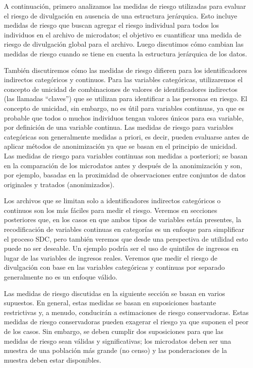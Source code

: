 \documentclass[
]{book}
\theoremstyle{definition}
\theoremstyle{definition}
\theoremstyle{definition}
\theoremstyle{definition}
\theoremstyle{remark}
\begin{document}
A continuación, primero analizamos las medidas de riesgo utilizadas para evaluar el riesgo de divulgación en ausencia de una estructura jerárquica. Esto incluye medidas de riesgo que buscan agregar el riesgo individual para todos los individuos en el archivo de microdatos; el objetivo es cuantificar una medida de riesgo de divulgación global para el archivo. Luego discutimos cómo cambian las medidas de riesgo cuando se tiene en cuenta la estructura jerárquica de los datos.

También discutiremos cómo las medidas de riesgo difieren para los identificadores indirectos categóricos y continuos. Para las variables categóricas, utilizaremos el concepto de unicidad de combinaciones de valores de identificadores indirectos (las llamadas ``claves'') que se utilizan para identificar a las personas en riesgo. El concepto de unicidad, sin embargo, no es útil para variables continuas, ya que es probable que todos o muchos individuos tengan valores únicos para esa variable, por definición de una variable continua. Las medidas de riesgo para variables categóricas son generalmente medidas a priori, es decir, pueden evaluarse antes de aplicar métodos de anonimización ya que se basan en el principio de unicidad. Las medidas de riesgo para variables continuas son medidas a posteriori; se basan en la comparación de los microdatos antes y después de la anonimización y son, por ejemplo, basadas en la proximidad de observaciones entre conjuntos de datos originales y tratados (anonimizados).

Los archivos que se limitan solo a identificadores indirectos categóricos o continuos son los más fáciles para medir el riesgo. Veremos en secciones posteriores que, en los casos en que ambos tipos de variables están presentes, la recodificación de variables continuas en categorías es un enfoque para simplificar el proceso SDC, pero también veremos que desde una perspectiva de utilidad esto puede no ser deseable. Un ejemplo podría ser el uso de quintiles de ingresos en lugar de las variables de ingresos reales. Veremos que medir el riesgo de divulgación con base en las variables categóricas y continuas por separado generalmente no es un enfoque válido.

Las medidas de riesgo discutidas en la siguiente sección se basan en varios supuestos. En general, estas medidas se basan en suposiciones bastante restrictivas y, a menudo, conducirán a estimaciones de riesgo conservadoras. Estas medidas de riesgo conservadoras pueden exagerar el riesgo ya que suponen el peor de los casos. Sin embargo, se deben cumplir dos suposiciones para que las medidas de riesgo sean válidas y significativas; los microdatos deben ser una muestra de una población más grande (no censo) y las ponderaciones de la muestra deben estar disponibles.
\end{document}
